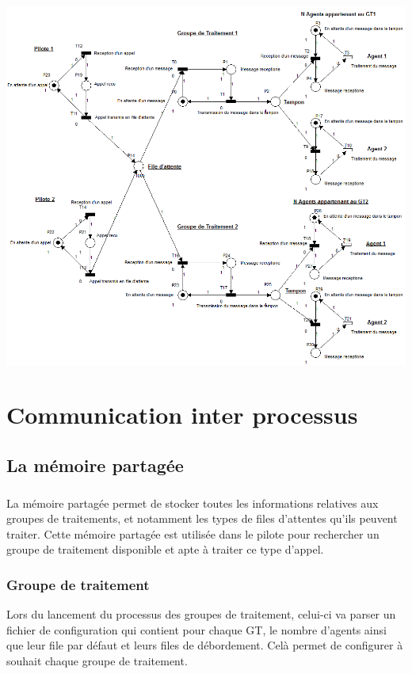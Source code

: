 \documentclass{report}
\begin{document}
		\paragraph{}
			\begin{center}
				\includegraphics[scale=0.50]{petri.png}
			\end{center}
\chapter{Communication inter processus}
	\section{La mémoire partagée}
		\paragraph{}
			La mémoire partagée permet de stocker toutes les informations relatives aux groupes de traitements, et notamment les types de files d'attentes qu'ils peuvent traiter. Cette mémoire partagée est utilisée dans le pilote pour rechercher un groupe de traitement disponible et apte à traiter ce type d'appel.

		\subsection{Groupe de traitement}
			Lors du lancement du processus des groupes de traitement, celui-ci va parser un fichier de configuration qui contient pour chaque GT, le nombre d'agents ainsi que leur file par défaut et leurs files de débordement. Celà permet de configurer à souhait chaque groupe de traitement.
\end{document}
